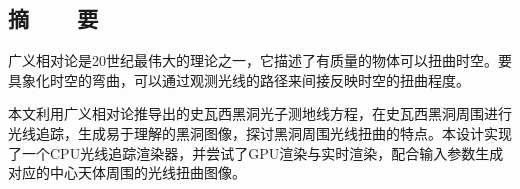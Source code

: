 %
%
%
%
%

\topskip=0pt

\vspace*{-7mm}

\begin{center}
  \songti{}\textbf{\thesisTitle}
\end{center}

\vspace*{2mm}

\begin{center}
{\let\clearpage\relax \chapter*{\songti{}\textbf{摘~~~~要}}}
\end{center}

\setcounter{page}{1}

\vspace*{1mm}

\setlength{\parskip}{0em}

广义相对论是20世纪最伟大的理论之一，它描述了有质量的物体可以扭曲时空。要具象化时空的弯曲，可以通过观测光线的路径来间接反映时空的扭曲程度。

本文利用广义相对论推导出的史瓦西黑洞光子测地线方程，在史瓦西黑洞周围进行光线追踪，生成易于理解的黑洞图像，探讨黑洞周围光线扭曲的特点。本设计实现了一个CPU光线追踪渲染器，并尝试了GPU渲染与实时渲染，配合输入参数生成对应的中心天体周围的光线扭曲图像。

\vspace{4ex}
\newpage

\topskip=0pt

\vspace*{2mm}

